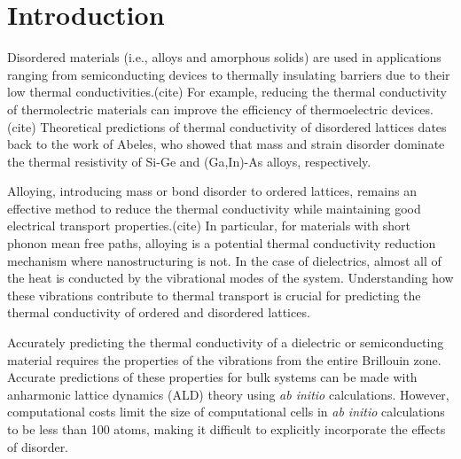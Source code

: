 \documentclass[aps,prb,twocolumn,superscriptaddress,amsmath,amssymb,floatfix]{revtex4}
\begin{document}
\section{\label{S:Introduction}Introduction}

Disordered materials (i.e., alloys and amorphous solids) are used in 
applications ranging from semiconducting devices to thermally insulating  
barriers due to their low thermal conductivities.(cite) 
For example, reducing 
the thermal conductivity of thermolectric materials can improve the 
efficiency of thermoelectric devices.(cite)  
Theoretical predictions of thermal conductivity of disordered 
lattices dates back to 
the work of Abeles, who showed that mass and strain 
disorder dominate the thermal resistivity of Si-Ge and 
(Ga,In)-As alloys, respectively.\cite{abeles_lattice_1963} 

Alloying, introducing mass or bond disorder to ordered lattices, 
remains an effective method to reduce the thermal conductivity 
while maintaining good electrical transport properties.(cite) 
In particular, for materials with short phonon mean free paths, 
alloying is a potential thermal conductivity reduction 
mechanism where nanostructuring is not.
\cite{qiu_molecular_2012,tian_phonon_2012} 
In the case of dielectrics, almost all of the heat is conducted by
the vibrational modes of the system. 
Understanding how these vibrations contribute to thermal transport 
is crucial for predicting the 
thermal conductivity of ordered and disordered lattices. 

Accurately predicting the thermal conductivity of a dielectric or 
semiconducting material requires the properties of the vibrations 
from the entire Brillouin zone.
\cite{ziman_electrons_2001,feldman_thermal_1993} 
Accurate predictions of these properties for bulk systems 
can be made with anharmonic lattice dynamics (ALD) theory 
using \emph{ab initio} 
calculations.\cite{ward_intrinsic_2010,lindsay_thermal_2012,
garg_role_2011,
shiga_microscopic_2012,tian_phonon_2012,
shiomi_thermal_2011,esfarjani_heat_2011}
However, computational costs limit the size of computational cells 
in \emph{ab initio} calculations to be less than 100 atoms, 
making it difficult to explicitly incorporate the effects of disorder.
\cite{koker_thermal_2009,bao_first-principles_2012,
lindsay_thermal_2012,tian_phonon_2012,garg_role_2011}
\end{document}
